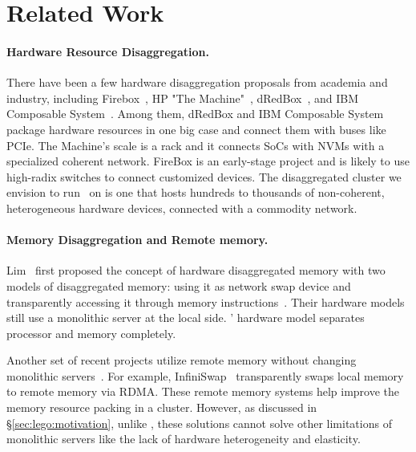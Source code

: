 \section{Related Work}
\label{sec:lego:related}

\paragraph{Hardware Resource Disaggregation.}
There have been a few hardware disaggregation proposals from academia and industry,
including Firebox~\cite{FireBox-FASTKeynote}, HP "The Machine"~\cite{HP-TheMachine,HP-MemoryOS}, dRedBox~\cite{dRedBox-DATE},
and IBM Composable System~\cite{IBM-Composable}.
Among them, dRedBox and IBM Composable System package hardware resources in one big case 
and connect them with buses like PCIe.
The Machine's scale is a rack and it connects SoCs with NVMs with a specialized coherent network.
FireBox is an early-stage project and is likely to use high-radix switches to connect  customized devices.
The disaggregated cluster we envision to run \lego\ on is one that hosts hundreds to thousands of
non-coherent, heterogeneous hardware devices, connected with a commodity network.

\paragraph{Memory Disaggregation and Remote memory.}
Lim \etal\ first proposed the concept of hardware disaggregated memory
with two models of disaggregated memory: using it as network swap device 
and transparently accessing it through memory instructions~\cite{Lim09-disaggregate,Lim12-HPCA}.
Their hardware models still use a monolithic server at the local side. 
\lego' hardware model separates processor and memory completely. %

Another set of recent projects utilize remote memory without changing 
monolithic servers~\cite{Dragojevic14-FaRM,Nelson15-ATC,remote-region-atc18,GU17-NSDI,Novakovic16-SOCC,hotpot-socc17}.
For example, InfiniSwap~\cite{GU17-NSDI} transparently swaps local memory to remote memory via RDMA.
These remote memory systems help improve the memory resource packing in a cluster.
However, as discussed in \S\ref{sec:lego:motivation}, unlike \lego, these solutions cannot solve other limitations 
of monolithic servers like the lack of hardware heterogeneity and elasticity. 

